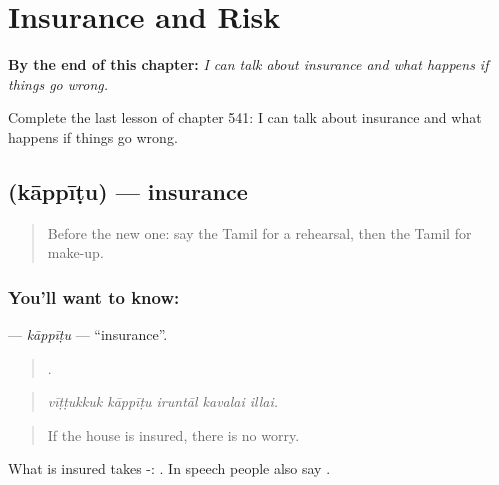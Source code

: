 
\chapter{Insurance and Risk}
\label{ch:ta-insurance-and-risk}

\begin{chapteropening}
\textbf{By the end of this chapter:} \emph{I can talk about insurance and what happens if things go wrong.}

Complete the last lesson of chapter 541: I can talk about insurance and what happens if things go wrong.
\end{chapteropening}

\section[\texorpdfstring{\ta{காப்பீடு} (kāppīṭu)}{காப்பீடு (kāppīṭu)}]{ (kāppīṭu) — insurance}

\label{lesson:TA-C541-kappitu}



\begin{quote}
Before the new one: say the Tamil for a rehearsal, then the Tamil for make-up.
\end{quote}

\subsection*{You'll want to know: }
\textbf{} — \emph{kāppīṭu} — \textquotedblleft{}insurance\textquotedblright{}.

\begin{quote}
    .
\end{quote}

\begin{quote}
\emph{vīṭṭukkuk kāppīṭu iruntāl kavalai illai.}
\end{quote}

\begin{quote}
If the house is insured, there is no worry.
\end{quote}

What is insured takes -:  . In speech people also say .

